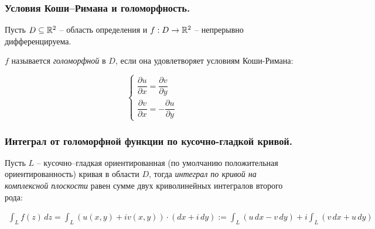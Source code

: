 \subsubsection{Условия Коши--Римана и голоморфность.}

\begin{definition*}
	Пусть $D \subseteq \mathbb{R}^2$ -- область определения и $f: D \to \mathbb{R}^2$ -- непрерывно дифференцируема.
	
	$f$ называется \textit{голоморфной} в $D$, если она удовлетворяет условиям Коши-Римана:
	
	\begin{equation}
	\begin{cases}
	\dfrac{\partial u}{\partial x} = \dfrac{\partial v}{\partial y} \\
	\dfrac{\partial v}{\partial x} = -\dfrac{\partial u}{\partial y}
	\end{cases}
	\end{equation}
\end{definition*}

\subsubsection{Интеграл от голоморфной функции по кусочно-гладкой кривой.}

\begin{definition*}
	Пусть $L$ -- кусочно--гладкая ориентированная (по умолчанию положительная ориентированность) кривая в области $D$, тогда \textit{интеграл по кривой на комплексной плоскости}  равен сумме двух криволинейных интегралов второго рода: 
	
	\begin{align*}
	\int_{L} f(z)\,dz = \int_{L} (u(x, y) + iv(x,y)) \cdot (dx + i\,dy) :=  \int_{L}  (u\,dx -v\,dy) + i  \int_{L} (v\,dx + u\,dy) 
	\end{align*}
\end{definition*}

